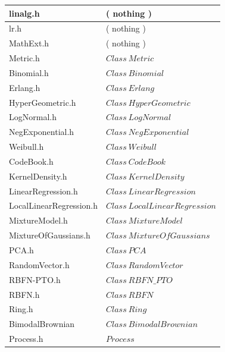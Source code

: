 \documentclass[twocolumn]{article}
\begin{document}
\begin{table}[h]
\begin{center}
{\begin{tabular}{|l|l|}
linalg.h                     & ( nothing )                           \\\hline
lr.h                         & ( nothing )                           \\\hline
MathExt.h                    & ( nothing )                           \\\hline
Metric.h                     & $Class \ Metric                     $ \\\hline
Binomial.h                   & $Class \ Binomial                   $ \\\hline
Erlang.h                     & $Class \ Erlang                     $ \\\hline
HyperGeometric.h             & $Class \ HyperGeometric             $ \\\hline
LogNormal.h                  & $Class \ LogNormal                  $ \\\hline
NegExponential.h             & $Class \ NegExponential             $ \\\hline
Weibull.h                    & $Class \ Weibull                    $ \\\hline
CodeBook.h                   & $Class \ CodeBook                   $ \\\hline
KernelDensity.h              & $Class \ KernelDensity              $ \\\hline
LinearRegression.h           & $Class \ LinearRegression           $ \\\hline
LocalLinearRegression.h      & $Class \ LocalLinearRegression      $ \\\hline
MixtureModel.h               & $Class \ MixtureModel               $ \\\hline
MixtureOfGaussians.h         & $Class \ MixtureOfGaussians         $ \\\hline
PCA.h                        & $Class \ PCA                        $ \\\hline
RandomVector.h               & $Class \ RandomVector               $ \\\hline
RBFN-PTO.h                   & $Class \ RBFN\_PTO                  $ \\\hline
RBFN.h                       & $Class \ RBFN                       $ \\\hline
Ring.h                       & $Class \ Ring                       $ \\\hline
BimodalBrownian              & $Class \ BimodalBrownian            $ \\
\hspace*{2mm} Process.h      & \hspace{2mm} $ Process              $ \\\hline

\end{tabular}}
\end{center}
\end{table}
\end{document}
